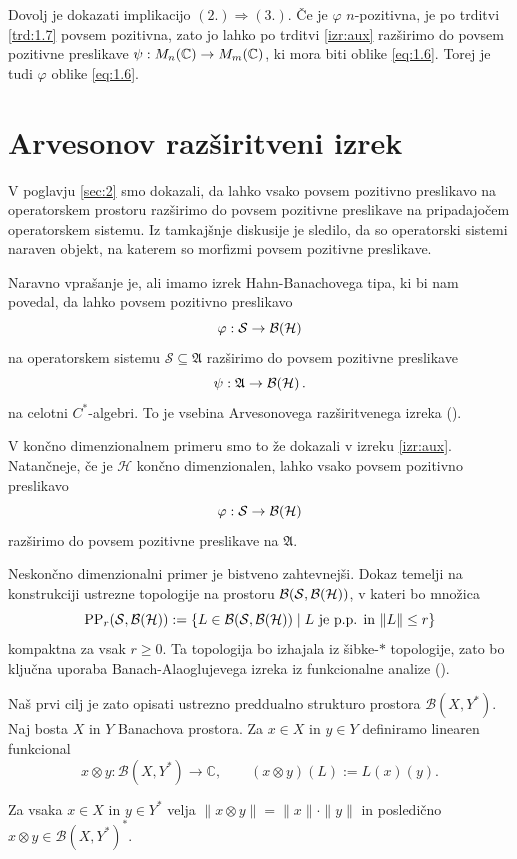 \begin{dokaz}
    Dovolj je dokazati implikacijo $(2.) \Rightarrow (3.)$. Če je $\varphi$ $n$-pozitivna,
    je po trditvi \ref{trd:1.7} povsem pozitivna,
    zato jo lahko po trditvi \ref{izr:aux} razširimo do povsem pozitivne preslikave $\psi: M_n (\mathbb C) \to M_m (\mathbb C)$, ki mora biti oblike \eqref{eq:1.6}.
    Torej je tudi $\varphi$ oblike \eqref{eq:1.6}.
\end{dokaz}

\section{Arvesonov razširitveni izrek}\label{sec:8}

V poglavju \ref{sec:2} smo dokazali, da lahko vsako povsem pozitivno preslikavo
na operatorskem prostoru razširimo do povsem pozitivne preslikave na pripadajočem operatorskem sistemu.
Iz tamkajšnje diskusije je sledilo, da so operatorski sistemi naraven objekt, na katerem so morfizmi povsem pozitivne preslikave.

Naravno vprašanje je, ali imamo 
izrek Hahn-Banachovega tipa, ki bi nam povedal, da 
lahko povsem pozitivno preslikavo $$
\varphi : \mathcal{S} \to \operatorname{\mathcal{B} (\mathcal{H})}
$$ na operatorskem sistemu $\mathcal{S} \subseteq \mathfrak{A}$ razširimo do povsem pozitivne preslikave $$
\psi : \mathfrak{A} \to \operatorname{\mathcal{B} (\mathcal{H})}.
$$ na celotni $C^*$-algebri.
To je vsebina Arvesonovega razširitvenega izreka (\cite{arveson1969}).

V končno dimenzionalnem primeru smo to že dokazali v izreku \ref{izr:aux}.
Natančneje, če je $\mathcal{H}$ končno dimenzionalen,
lahko vsako povsem pozitivno preslikavo
$$
\varphi : \mathcal{S} \to \operatorname{\mathcal{B} (\mathcal{H})}
$$
razširimo do povsem pozitivne preslikave na $\mathfrak{A}$.

Neskončno dimenzionalni primer je bistveno zahtevnejši.
Dokaz temelji na konstrukciji ustrezne topologije na prostoru
$\mathcal{B}(\mathcal{S}, \operatorname{\mathcal{B} (\mathcal{H})})$,
v kateri bo množica
$$
\operatorname{PP}_r(\mathcal{S}, \operatorname{\mathcal{B} (\mathcal{H})})
:=
\{L \in \mathcal{B}(\mathcal{S}, \operatorname{\mathcal{B} (\mathcal{H})})
\mid
\text{$L$ je p.p. in $\|L\| \le r$}\}
$$
kompaktna za vsak $r \ge 0$.
Ta topologija bo izhajala iz šibke-$*$ topologije,
zato bo ključna uporaba Banach-Alaoglujevega izreka iz funkcionalne analize (\cite[Theorem V.3.1., str. 130]{conway1990}).

Naš prvi cilj je zato opisati ustrezno preddualno strukturo prostora
$\mathcal{B}(X,Y^*)$.
Naj bosta $X$ in $Y$ Banachova prostora.
Za $x \in X$ in $y \in Y$ definiramo linearen funkcional
$$
x \otimes y : \mathcal{B}(X,Y^*) \to \mathbb{C},
\qquad
(x \otimes y)(L) := L(x)(y).
$$
\begin{lema}
    Za vsaka $x \in X$ in $y \in Y^*$ velja $\| x \otimes y\| = \| x\| \cdot \| y\|$ in posledično
    $x \otimes y \in \mathcal{B}(X, Y^*)^*$.
\end{lema}


